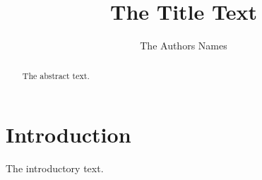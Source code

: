 \documentclass{article}
\title{The Title Text}
\author{The Authors Names}
\begin{document}
\maketitle
\begin{abstract}
The abstract text.
\end{abstract}
\section{Introduction}
The introductory text.
\end{document}
